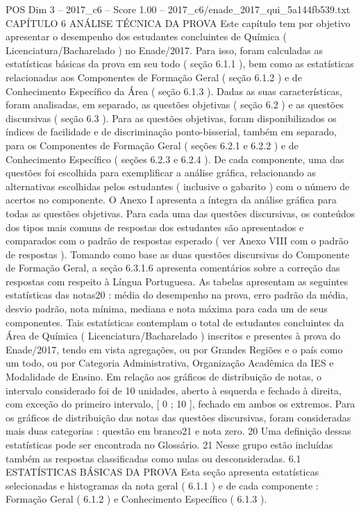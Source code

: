 \begin{textsample}{POS Dim 3 – 2017\_c6 – Score 1.00 – 2017\_c6/enade\_2017\_qui\_5a144fb539.txt}  \label{ex:f3_pos_199}
CAPÍTULO 6 ANÁLISE TÉCNICA DA PROVA Este capítulo tem por objetivo apresentar o desempenho dos estudantes concluintes de Química ( Licenciatura/Bacharelado ) no Enade/2017.
Para isso, foram calculadas as estatísticas básicas da prova em seu todo ( seção 6.1.1 ), bem como as estatísticas relacionadas aos Componentes de Formação Geral ( seção 6.1.2 ) e de Conhecimento Específico da Área ( seção 6.1.3 ).
Dadas as suas características, foram analisadas, em separado, as questões objetivas ( seção 6.2 ) e as questões discursivas ( seção 6.3 ).
Para as questões objetivas, foram disponibilizados os índices de facilidade e de discriminação ponto-bisserial, também em separado, para os Componentes de Formação Geral ( seções 6.2.1 e 6.2.2 ) e de Conhecimento Específico ( seções 6.2.3 e 6.2.4 ).
De cada componente, uma das questões foi escolhida para exemplificar a análise gráfica, relacionando as alternativas escolhidas pelos estudantes ( inclusive o gabarito ) com o número de acertos no componente.
O Anexo I apresenta a íntegra da análise gráfica para todas as questões objetivas.
Para cada uma das questões discursivas, os conteúdos dos tipos mais comuns de respostas dos estudantes são apresentados e comparados com o padrão de respostas esperado ( ver Anexo VIII com o padrão de respostas ).
Tomando como base as duas questões discursivas do Componente de Formação Geral, a seção 6.3.1.6 apresenta comentários sobre a correção das respostas com respeito à Língua Portuguesa.
As tabelas apresentam as seguintes estatísticas das notas20 : média do desempenho na prova, erro padrão da média, desvio padrão, nota mínima, mediana e nota máxima para cada um de seus componentes.
Tais estatísticas contemplam o total de estudantes concluintes da Área de Química ( Licenciatura/Bacharelado ) inscritos e presentes à prova do Enade/2017, tendo em vista agregações, ou por Grandes Regiões e o país como um todo, ou por Categoria Administrativa, Organização Acadêmica da IES e Modalidade de Ensino.
Em relação aos gráficos de distribuição de notas, o intervalo considerado foi de 10 unidades, aberto à esquerda e fechado à direita, com exceção do primeiro intervalo, [ 0 ; 10 ], fechado em ambos os extremos.
Para os gráficos de distribuição das notas das questões discursivas, foram consideradas mais duas categorias : questão em branco21 e nota zero. 20 Uma definição dessas estatísticas pode ser encontrada no Glossário. 21 Nesse grupo estão incluídas também as respostas classificadas como nulas ou desconsideradas. 6.1 ESTATÍSTICAS BÁSICAS DA PROVA Esta seção apresenta estatísticas selecionadas e histogramas da nota geral ( 6.1.1 ) e de cada componente : Formação Geral ( 6.1.2 ) e Conhecimento Específico ( 6.1.3 ).

\end{textsample}
